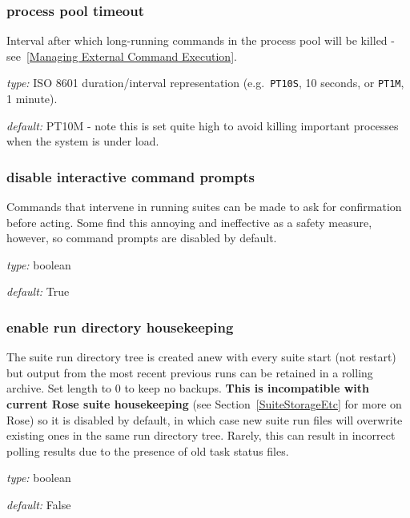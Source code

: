 \subsubsection{process pool timeout}
\label{process pool timeout}

Interval after which long-running commands in the process pool will be killed -
see~\ref{Managing External Command Execution}.

\begin{myitemize}
\item {\em type:} ISO 8601 duration/interval representation (e.g.\ 
\lstinline=PT10S=, 10 seconds, or \lstinline=PT1M=, 1 minute).
\item {\em default:} PT10M -  note this is set quite high to avoid killing
  important processes when the system is under load.
\end{myitemize}

\subsubsection{disable interactive command prompts}

Commands that intervene in running suites can be made to ask for
confirmation before acting. Some find this annoying and ineffective as a
safety measure, however, so command prompts are disabled by default.

\begin{myitemize}
\item {\em type:} boolean
\item {\em default:} True
\end{myitemize}

\subsubsection{enable run directory housekeeping}

The suite run directory tree is created anew with every suite start
(not restart) but output from the most recent previous runs can be
retained in a rolling archive. Set length to 0 to keep no backups.
{\bf This is incompatible with current Rose suite housekeeping} (see
Section~\ref{SuiteStorageEtc} for more on Rose) so it is disabled by
default, in which case new suite run files will overwrite existing ones
in the same run directory tree. Rarely, this can result in incorrect
polling results due to the presence of old task status files.

\begin{myitemize}
\item {\em type:} boolean
\item {\em default:} False
\end{myitemize}

